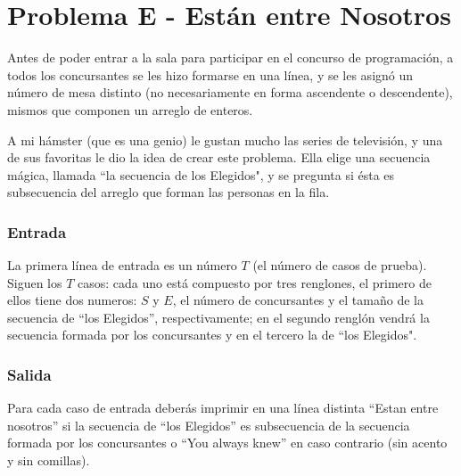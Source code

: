 \chapter*{Problema E - Están entre Nosotros}
Antes de poder entrar a la sala para participar en el concurso de programación, a todos los concursantes se les hizo formarse en una línea, y se les asignó un número de mesa distinto (no necesariamente en forma ascendente o descendente), mismos que componen un arreglo de enteros.

A mi hámster (que es una genio) le gustan mucho las series de televisión, y una de sus favoritas le dio la idea de crear este problema. Ella elige una secuencia mágica, llamada ``la secuencia de los Elegidos", y se pregunta si ésta es subsecuencia del arreglo que forman las personas en la fila.









\subsection*{Entrada}

La primera línea de entrada es un número $T$ (el número de
casos de prueba). Siguen los $T$ casos: cada uno está
compuesto por tres renglones, el primero de ellos tiene dos numeros: $S$ y   $E$, el número de concursantes y el tamaño de la secuencia de ``los Elegidos'', respectivamente; en el segundo renglón vendrá la secuencia formada por los concursantes y en el tercero la de ``los Elegidos".




\subsection*{Salida}

Para cada caso de entrada deberás imprimir en una línea distinta ``Estan entre nosotros'' si la secuencia de ``los Elegidos'' es subsecuencia de la secuencia formada por los concursantes o ``You always knew'' en caso contrario (sin acento y sin comillas).

